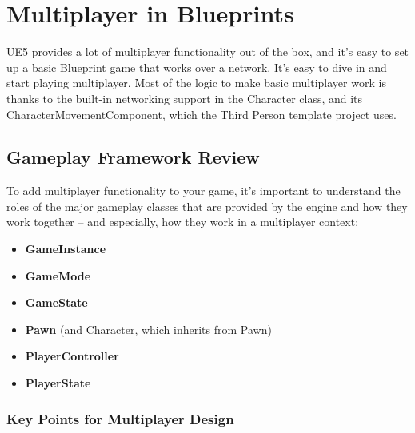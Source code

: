 \documentclass[
  letterpaper,
  DIV=11,
  numbers=noendperiod]{scrartcl}
\providecommand{\tightlist}{%
  \setlength{\itemsep}{0pt}\setlength{\parskip}{0pt}}
\begin{document}
\section{Multiplayer in Blueprints}\label{multiplayer-in-blueprints}

UE5 provides a lot of multiplayer functionality out of the box, and it's
easy to set up a basic Blueprint game that works over a network. It's
easy to dive in and start playing multiplayer. Most of the logic to make
basic multiplayer work is thanks to the built-in networking support in
the Character class, and its CharacterMovementComponent, which the Third
Person template project uses.

\subsection{Gameplay Framework Review}\label{gameplay-framework-review}

To add multiplayer functionality to your game, it's important to
understand the roles of the major gameplay classes that are provided by
the engine and how they work together -- and especially, how they work
in a multiplayer context:

\begin{itemize}
\tightlist
\item
  \textbf{GameInstance}
\item
  \textbf{GameMode}
\item
  \textbf{GameState}
\item
  \textbf{Pawn} (and Character, which inherits from Pawn)
\item
  \textbf{PlayerController}
\item
  \textbf{PlayerState}
\end{itemize}

\subsubsection{Key Points for Multiplayer
Design}\label{key-points-for-multiplayer-design}
\end{document}
